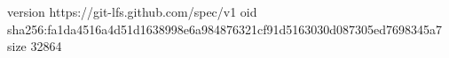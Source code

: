 version https://git-lfs.github.com/spec/v1
oid sha256:fa1da4516a4d51d1638998e6a984876321cf91d5163030d087305ed7698345a7
size 32864
